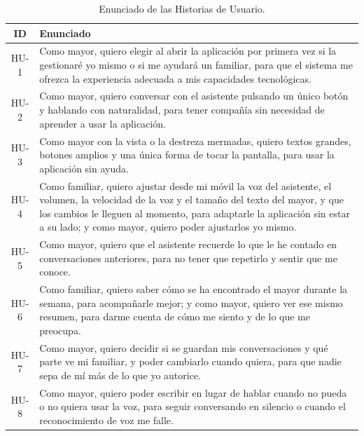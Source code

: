 \begin{table}[htbp]
    \centering
    \caption{Enunciado de las Historias de Usuario.}
    \label{tab:enunciado-hu}
    \small
    \begin{tabularx}{\textwidth}{@{}c >{\RaggedRight\arraybackslash}X@{}}
        \toprule
        \textbf{ID} & \textbf{Enunciado} \\
        \midrule
        HU-1 & Como mayor, quiero elegir al abrir la aplicación por primera vez si la gestionaré yo mismo o si me ayudará un familiar, para que el sistema me ofrezca la experiencia adecuada a mis capacidades tecnológicas. \\
        \addlinespace
        HU-2 & Como mayor, quiero conversar con el asistente pulsando un único botón y hablando con naturalidad, para tener compañía sin necesidad de aprender a usar la aplicación. \\
        \addlinespace
        HU-3 & Como mayor con la vista o la destreza mermadas, quiero textos grandes, botones amplios y una única forma de tocar la pantalla, para usar la aplicación sin ayuda. \\
        \addlinespace
        HU-4 & Como familiar, quiero ajustar desde mi móvil la voz del asistente, el volumen, la velocidad de la voz y el tamaño del texto del mayor, y que los cambios le lleguen al momento, para adaptarle la aplicación sin estar a su lado; y como mayor, quiero poder ajustarlos yo mismo. \\
        \addlinespace
        HU-5 & Como mayor, quiero que el asistente recuerde lo que le he contado en conversaciones anteriores, para no tener que repetirlo y sentir que me conoce. \\
        \addlinespace
        HU-6 & Como familiar, quiero saber cómo se ha encontrado el mayor durante la semana, para acompañarle mejor; y como mayor, quiero ver ese mismo resumen, para darme cuenta de cómo me siento y de lo que me preocupa. \\
        \addlinespace
        HU-7 & Como mayor, quiero decidir si se guardan mis conversaciones y qué parte ve mi familiar, y poder cambiarlo cuando quiera, para que nadie sepa de mí más de lo que yo autorice. \\
        \addlinespace
        HU-8 & Como mayor, quiero poder escribir en lugar de hablar cuando no pueda o no quiera usar la voz, para seguir conversando en silencio o cuando el reconocimiento de voz me falle. \\
        \bottomrule
    \end{tabularx}

\end{table}

